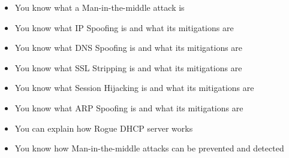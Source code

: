 \begin{itemize}
	\item You know what a Man-in-the-middle attack is
	\item You know what IP Spoofing is and what its mitigations are
	\item You know what DNS Spoofing is and what its mitigations are
	\item You know what SSL Stripping is and what its mitigations are
	\item You know what Session Hijacking is and what its mitigations are
	\item You know what ARP Spoofing is and what its mitigations are
	\item You can explain how Rogue DHCP server works
	\item You know how Man-in-the-middle attacks can be prevented and detected
\end{itemize}